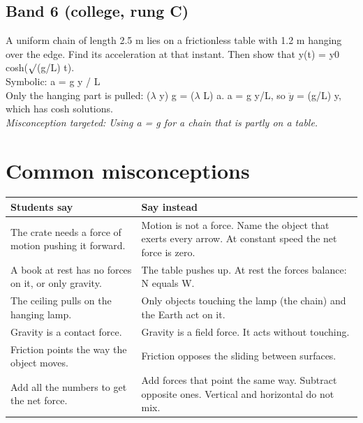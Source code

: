 \documentclass[11pt]{article}
\begin{document}
\subsection*{Band 6 (college, rung C)}
\noindent A uniform chain of length 2.5 m lies on a frictionless table with 1.2 m hanging over the edge. Find its acceleration at that instant. Then show that y(t) = y0 cosh($\surd$(g/L) t).\\  \quad Symbolic: a = g y / L\\ Only the hanging part is pulled: ($\lambda$ y) g = ($\lambda$ L) a. a = g y/L, so $\ddot{y}$ = (g/L) y, which has cosh solutions.\\ \textit{Misconception targeted: Using a = g for a chain that is partly on a table.}\par
\section*{Common misconceptions}\begin{tabularx}{\textwidth}{@{}X X@{}}\toprule Students say & Say instead\\\midrule
The crate needs a force of motion pushing it forward. & Motion is not a force. Name the object that exerts every arrow. At constant speed the net force is zero.\\
A book at rest has no forces on it, or only gravity. & The table pushes up. At rest the forces balance: N equals W.\\
The ceiling pulls on the hanging lamp. & Only objects touching the lamp (the chain) and the Earth act on it.\\
Gravity is a contact force. & Gravity is a field force. It acts without touching.\\
Friction points the way the object moves. & Friction opposes the sliding between surfaces.\\
Add all the numbers to get the net force. & Add forces that point the same way. Subtract opposite ones. Vertical and horizontal do not mix.\\
\bottomrule\end{tabularx}
\end{document}
